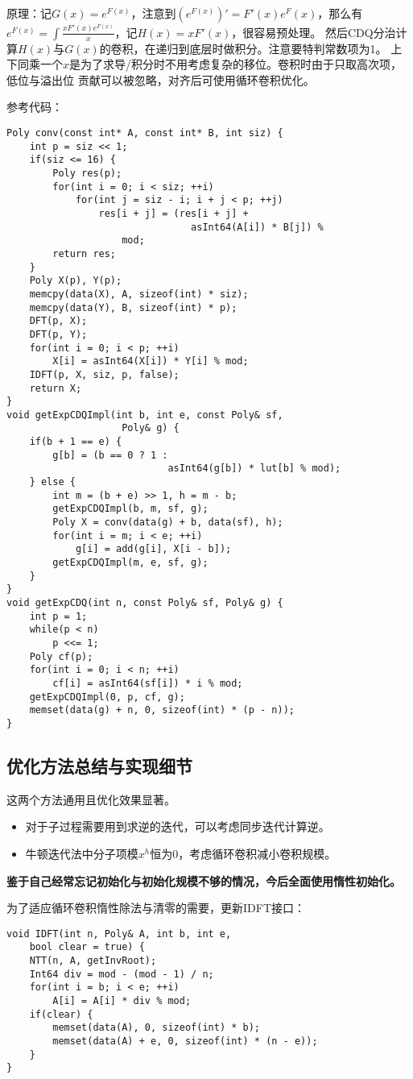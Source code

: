 原理：记$G(x)=e^{F(x)}$，注意到$(e^{F(x)})'=F'(x)e^F(x)$，那么有
$e^{F(x)}=\int{\frac{xF'(x)e^{F(x)}}{x}}$，记$H(x)=xF'(x)$，很容易预处理。
然后CDQ分治计算$H(x)$与$G(x)$的卷积，在递归到底层时做积分。注意要特判常数项为1。
上下同乘一个$x$是为了求导/积分时不用考虑复杂的移位。卷积时由于只取高次项，低位与溢出位
贡献可以被忽略，对齐后可使用循环卷积优化。

参考代码：
\begin{lstlisting}
Poly conv(const int* A, const int* B, int siz) {
    int p = siz << 1;
    if(siz <= 16) {
        Poly res(p);
        for(int i = 0; i < siz; ++i)
            for(int j = siz - i; i + j < p; ++j)
                res[i + j] = (res[i + j] +
                                asInt64(A[i]) * B[j]) %
                    mod;
        return res;
    }
    Poly X(p), Y(p);
    memcpy(data(X), A, sizeof(int) * siz);
    memcpy(data(Y), B, sizeof(int) * p);
    DFT(p, X);
    DFT(p, Y);
    for(int i = 0; i < p; ++i)
        X[i] = asInt64(X[i]) * Y[i] % mod;
    IDFT(p, X, siz, p, false);
    return X;
}
void getExpCDQImpl(int b, int e, const Poly& sf,
                    Poly& g) {
    if(b + 1 == e) {
        g[b] = (b == 0 ? 1 :
                            asInt64(g[b]) * lut[b] % mod);
    } else {
        int m = (b + e) >> 1, h = m - b;
        getExpCDQImpl(b, m, sf, g);
        Poly X = conv(data(g) + b, data(sf), h);
        for(int i = m; i < e; ++i)
            g[i] = add(g[i], X[i - b]);
        getExpCDQImpl(m, e, sf, g);
    }
}
void getExpCDQ(int n, const Poly& sf, Poly& g) {
    int p = 1;
    while(p < n)
        p <<= 1;
    Poly cf(p);
    for(int i = 0; i < n; ++i)
        cf[i] = asInt64(sf[i]) * i % mod;
    getExpCDQImpl(0, p, cf, g);
    memset(data(g) + n, 0, sizeof(int) * (p - n));
}
\end{lstlisting}
\subsection{优化方法总结与实现细节}
这两个方法通用且优化效果显著。
\begin{itemize}
    \item 对于子过程需要用到求逆的迭代，可以考虑同步迭代计算逆。
    \item 牛顿迭代法中分子项模$x^h$恒为0，考虑循环卷积减小卷积规模。
\end{itemize}

{\bfseries 鉴于自己经常忘记初始化与初始化规模不够的情况，今后全面使用惰性初始化。}

为了适应循环卷积惰性除法与清零的需要，更新IDFT接口：
\begin{lstlisting}
void IDFT(int n, Poly& A, int b, int e,
    bool clear = true) {
    NTT(n, A, getInvRoot);
    Int64 div = mod - (mod - 1) / n;
    for(int i = b; i < e; ++i)
        A[i] = A[i] * div % mod;
    if(clear) {
        memset(data(A), 0, sizeof(int) * b);
        memset(data(A) + e, 0, sizeof(int) * (n - e));
    }
}
\end{lstlisting}

